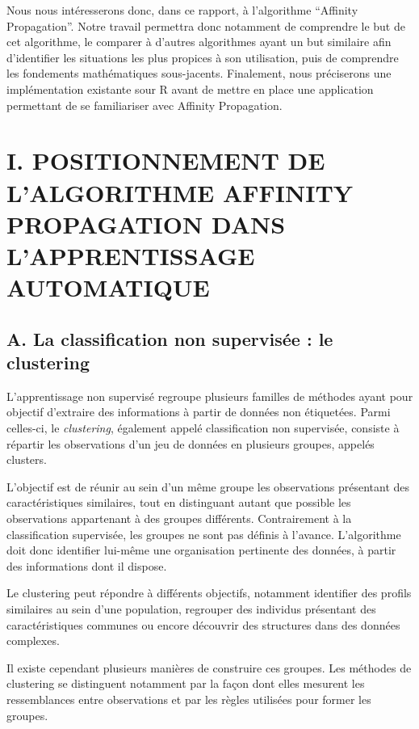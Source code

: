 \documentclass[11pt,a4paper]{memoirerecherche}
\begin{document}
Nous nous intéresserons donc, dans ce rapport, à l'algorithme ``Affinity
Propagation''. Notre travail permettra donc notamment de comprendre le
but de cet algorithme, le comparer à d'autres algorithmes ayant un but
similaire afin d'identifier les situations les plus propices à son
utilisation, puis de comprendre les fondements mathématiques
sous-jacents. Finalement, nous préciserons une implémentation existante
sour R avant de mettre en place une application permettant de se
familiariser avec Affinity Propagation.

\newpage

\section{I. POSITIONNEMENT DE L'ALGORITHME AFFINITY PROPAGATION DANS
L'APPRENTISSAGE
AUTOMATIQUE}\label{i.-positionnement-de-lalgorithme-affinity-propagation-dans-lapprentissage-automatique}

\subsection{A. La classification non supervisée : le
clustering}\label{a.-la-classification-non-supervisuxe9e-le-clustering}

L'apprentissage non supervisé regroupe plusieurs familles de méthodes
ayant pour objectif d'extraire des informations à partir de données non
étiquetées. Parmi celles-ci, le \emph{clustering}, également appelé
classification non supervisée, consiste à répartir les observations d'un
jeu de données en plusieurs groupes, appelés clusters.

L'objectif est de réunir au sein d'un même groupe les observations
présentant des caractéristiques similaires, tout en distinguant autant
que possible les observations appartenant à des groupes différents.
Contrairement à la classification supervisée, les groupes ne sont pas
définis à l'avance. L'algorithme doit donc identifier lui-même une
organisation pertinente des données, à partir des informations dont il
dispose.

Le clustering peut répondre à différents objectifs, notamment identifier
des profils similaires au sein d'une population, regrouper des individus
présentant des caractéristiques communes ou encore découvrir des
structures dans des données complexes.

Il existe cependant plusieurs manières de construire ces groupes. Les
méthodes de clustering se distinguent notamment par la façon dont elles
mesurent les ressemblances entre observations et par les règles
utilisées pour former les groupes.
\end{document}
